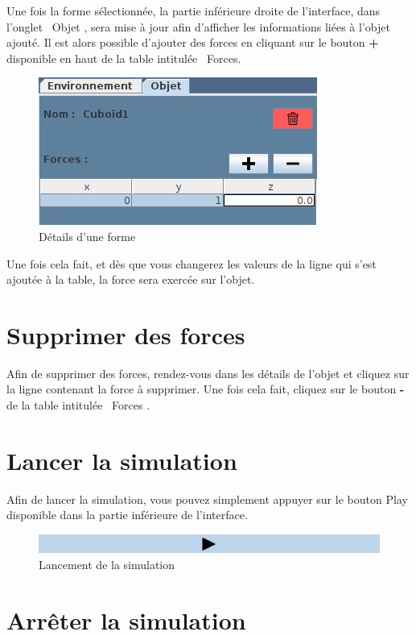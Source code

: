 \documentclass[11pt]{report}
\begin{document}
Une fois la forme sélectionnée, la partie inférieure droite de l'interface, dans l'onglet \flqq\ Objet \frqq, sera mise à jour afin d'afficher
les informations liées à l'objet ajouté. Il est alors possible d'ajouter des forces en cliquant sur le bouton \textbf{+} disponible en haut
de la table intitulée \flqq\ Forces\frqq.

\begin{figure}[h]
  \centering
  \includegraphics{./proprieteForme.png}
  \caption{Détails d'une forme}
\end{figure}

Une fois cela fait, et dès que vous changerez les valeurs de la ligne qui s'est ajoutée à la table, la force sera exercée sur l'objet.

\section{Supprimer des forces}

Afin de supprimer des forces, rendez-vous dans les détails de l'objet et cliquez sur la ligne contenant la force à supprimer. Une fois cela fait,
cliquez sur le bouton \textbf{-} de la table intitulée \flqq\ Forces \frqq.

\section{Lancer la simulation}

Afin de lancer la simulation, vous pouvez simplement appuyer sur le bouton Play disponible dans la partie inférieure de l'interface.

\begin{figure}[h]
  \centering
  \includegraphics[width=16cm]{./btn_play.png}
  \caption{Lancement de la simulation}
\end{figure}

\section{Arrêter la simulation}
\end{document}
